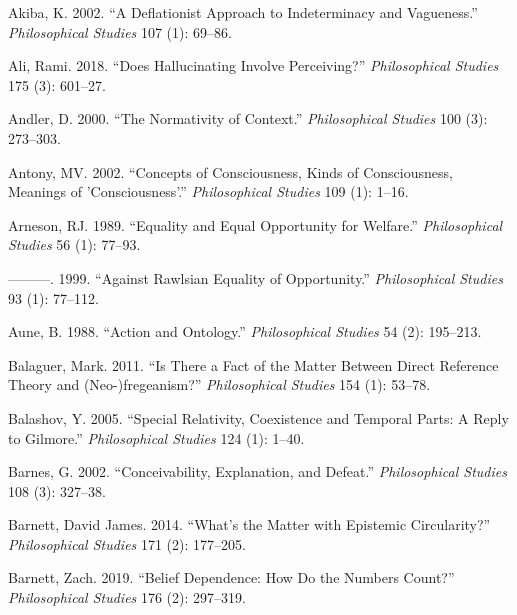 \documentclass[
  10pt,
  letterpaper,
  DIV=11,
  numbers=noendperiod,
  twoside]{scrartcl}
\newlength{\cslhangindent}
\newenvironment{CSLReferences}[2] %
 {\begin{list}{}{%
  \setlength{\itemindent}{0pt}
  \setlength{\leftmargin}{0pt}
  \setlength{\parsep}{0pt}
  \ifodd #1
   \setlength{\leftmargin}{\cslhangindent}
   \setlength{\itemindent}{-1\cslhangindent}
  \fi
  \setlength{\itemsep}{#2\baselineskip}}}
 {\end{list}}
\begin{document}
\label{refs}
\begin{CSLReferences}{1}{0}
Akiba, K. 2002. {``A Deflationist Approach to Indeterminacy and
Vagueness.''} \emph{Philosophical Studies} 107 (1): 69--86.

Ali, Rami. 2018. {``Does Hallucinating Involve Perceiving?''}
\emph{Philosophical Studies} 175 (3): 601--27.

Andler, D. 2000. {``The Normativity of Context.''} \emph{Philosophical
Studies} 100 (3): 273--303.

Antony, MV. 2002. {``Concepts of Consciousness, Kinds of Consciousness,
Meanings of 'Consciousness'.''} \emph{Philosophical Studies} 109 (1):
1--16.

Arneson, RJ. 1989. {``Equality and Equal Opportunity for Welfare.''}
\emph{Philosophical Studies} 56 (1): 77--93.

---------. 1999. {``Against Rawlsian Equality of Opportunity.''}
\emph{Philosophical Studies} 93 (1): 77--112.

Aune, B. 1988. {``Action and Ontology.''} \emph{Philosophical Studies}
54 (2): 195--213.

Balaguer, Mark. 2011. {``Is There a Fact of the Matter Between Direct
Reference Theory and (Neo-)fregeanism?''} \emph{Philosophical Studies}
154 (1): 53--78.

Balashov, Y. 2005. {``Special Relativity, Coexistence and Temporal
Parts: A Reply to Gilmore.''} \emph{Philosophical Studies} 124 (1):
1--40.

Barnes, G. 2002. {``Conceivability, Explanation, and Defeat.''}
\emph{Philosophical Studies} 108 (3): 327--38.

Barnett, David James. 2014. {``What's the Matter with Epistemic
Circularity?''} \emph{Philosophical Studies} 171 (2): 177--205.

Barnett, Zach. 2019. {``Belief Dependence: How Do the Numbers Count?''}
\emph{Philosophical Studies} 176 (2): 297--319.


\end{CSLReferences}
\end{document}
